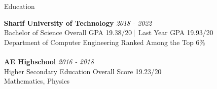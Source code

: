 \documentclass{resume} %
\begin{document}
\begin{rSection}{Education}

{\bf Sharif University of Technology} \hfill \textcolor{Black!70}{\em 2018 - 2022} 
\\ Bachelor of Science \hfill \textcolor{Black!70}{ Overall GPA 19.38/20 | Last Year GPA 19.93/20}
\\ Department of Computer Engineering \hfill \textcolor{Black!70}{Ranked Among the Top 6\%}
\\
\\{\bf AE Highschool} \hfill \textcolor{Black!70}{\em 2016 - 2018} 
\\ Higher Secondary Education \hfill \textcolor{Black!70}{ Overall Score 19.23/20}
\\ Mathematics, Physics
\\



\end{rSection}
\end{document}
